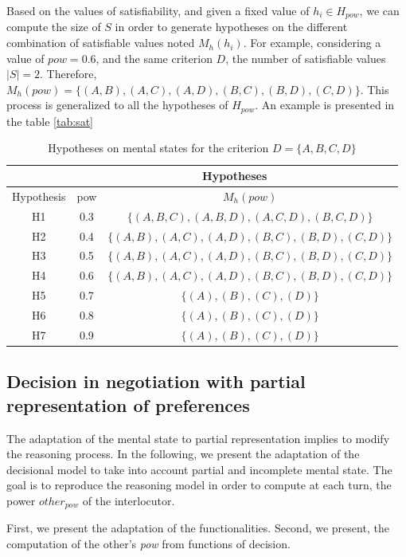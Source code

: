 \documentclass[sigconf]{aamas}  %
\begin{document}
	Based on the values of satisfiability, and given a fixed value of $h_i \in H_{pow}$, we can compute the size of $S$ in order to generate hypotheses on the different combination of satisfiable values  noted $M_h(h_i)$. For example, considering a value of $pow =0.6$, and the same criterion $D$, the number of satisfiable values $|S| = 2$. Therefore, $M_h(pow) = \{(A,B), (A,C), (A,D), (B,C), (B,D), (C,D)\}$. This process is generalized to all the hypotheses of $H_{pow}$. An example is presented in the table \ref{tab:sat}
	
	
	
	
	\begin{table}[h]
		\centering
		\begin{tabular}{ |c|c|c| }
			\hline
			& \multicolumn{2}{c|}{Hypotheses}  \\
			\hline
			Hypothesis & pow & $M_h(pow)$ \\
			\hline
			H1&0.3&$\{ (A,B,C) , (A,B,D), (A,C,D), (B,C,D) \}$ \\
			\hline
			H2&0.4&$\{ (A,B), (A,C), (A,D), (B,C), (B,D), (C,D) \}$ \\
			\hline
			H3&0.5&$\{ (A,B), (A,C), (A,D), (B,C), (B,D), (C,D) \}$\\
			\hline
			H4&0.6&$\{ (A,B), (A,C), (A,D), (B,C), (B,D), (C,D) \}$ \\
			\hline
			H5&0.7&$\{ (A), (B), (C), (D) \}$\\
			\hline
			H6&0.8&$\{ (A), (B), (C), (D) \}$ \\
			\hline
			H7&0.9&$\{ (A), (B), (C), (D) \}$ \\
			\hline
		\end{tabular}
		\caption{Hypotheses on mental states for the criterion $D=\{A, B, C, D\}$}
		\label{table:poss}
	\end{table}
	
	\subsection{Decision in negotiation with partial representation of preferences}
	The adaptation of the mental state to partial representation implies to modify the reasoning process. In the following, we present the adaptation of the decisional model to take into account partial and incomplete mental state. The goal is to reproduce the reasoning model in order to compute at each turn, the power $other_{pow}$ of the interlocutor. 
	
	First, we present the adaptation of the functionalities. Second, we present, the computation of the other's \emph{pow} from functions of decision.   
	
\end{document}
